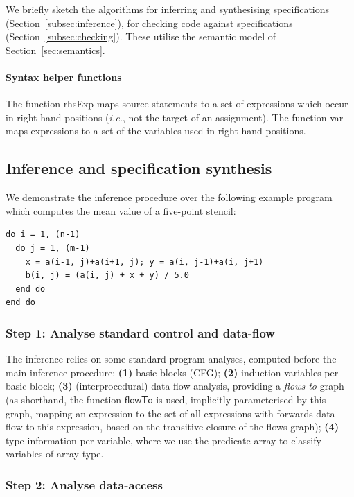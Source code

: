 \documentclass[9pt,preprint]{sigplanconf}
\newcounter{block}
\theoremstyle{definition}
\newcommand{\ie}{\emph{i.e.}}
\newcommand{\arrayTy}{\textsf{array}}
\newcommand{\rhsExp}{\textsf{rhsExp}}
\newcommand{\var}{\textsf{var}}
\begin{document}
\noindent
We briefly sketch the algorithms for inferring and synthesising
specifications (Section~\ref{subsec:inference}), for checking code
against specifications (Section~\ref{subsec:checking}). These utilise the semantic model of
Section~\ref{sec:semantics}.

\paragraph{Syntax helper functions}
The function \rhsExp{} maps source statements to a
set of expressions which occur in right-hand positions (\ie{}, not the
target of an assignment). The function \var{} maps expressions to a
set of the variables used in right-hand positions.

\subsection{Inference and specification synthesis\label{subsec:inference}}

We demonstrate the inference procedure over the
following example program which computes the mean value
of a five-point stencil:%
\begin{verbatim}
do i = 1, (n-1)
  do j = 1, (m-1)
    x = a(i-1, j)+a(i+1, j); y = a(i, j-1)+a(i, j+1)
    b(i, j) = (a(i, j) + x + y) / 5.0
  end do
end do
\end{verbatim}
\subsubsection{Step 1: Analyse standard control and data-flow}
\label{sec:inf-step1}

The inference relies on some standard program analyses, computed
before the main inference procedure:
%
\textbf{(1)} basic blocks (CFG);
\textbf{(2)} induction variables per basic block;
\textbf{(3)} (interprocedural) data-flow analysis, providing a \emph{flows to}
  graph (as shorthand, the function
  $\mathsf{flowTo}$ is used, implicitly parameterised by this graph,
  mapping an expression to the set of all expressions
  with forwards data-flow to this expression, based on the transitive
  closure of the flows graph);
\textbf{(4)} type information per variable, where we use the predicate
\arrayTy{} to classify variables of array type.
%

\subsubsection{Step 2: Analyse data-access}
\label{sec:inf-step2}
\end{document}
